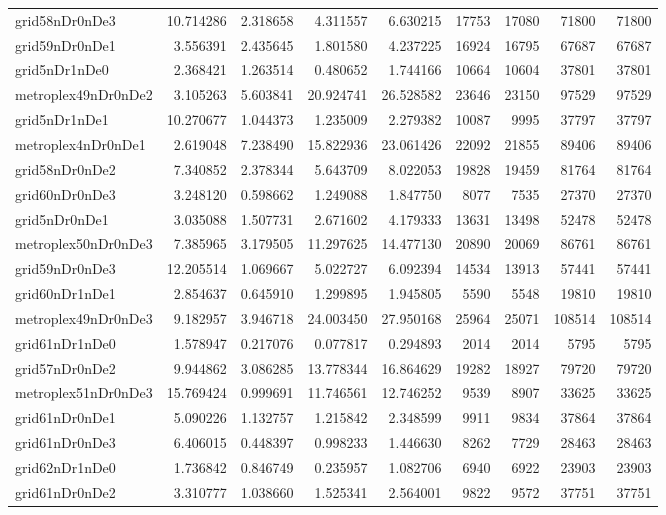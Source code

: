\begin{longtable}{|l|r|r|r|r|r|r|r|r|}
grid58nDr0nDe3 & 10.714286 & 2.318658 & 4.311557 & 6.630215 & 17753 & 17080 & 71800 & 71800 \\
grid59nDr0nDe1 & 3.556391 & 2.435645 & 1.801580 & 4.237225 & 16924 & 16795 & 67687 & 67687 \\
grid5nDr1nDe0 & 2.368421 & 1.263514 & 0.480652 & 1.744166 & 10664 & 10604 & 37801 & 37801 \\
metroplex49nDr0nDe2 & 3.105263 & 5.603841 & 20.924741 & 26.528582 & 23646 & 23150 & 97529 & 97529 \\
grid5nDr1nDe1 & 10.270677 & 1.044373 & 1.235009 & 2.279382 & 10087 & 9995 & 37797 & 37797 \\
metroplex4nDr0nDe1 & 2.619048 & 7.238490 & 15.822936 & 23.061426 & 22092 & 21855 & 89406 & 89406 \\
grid58nDr0nDe2 & 7.340852 & 2.378344 & 5.643709 & 8.022053 & 19828 & 19459 & 81764 & 81764 \\
grid60nDr0nDe3 & 3.248120 & 0.598662 & 1.249088 & 1.847750 & 8077 & 7535 & 27370 & 27370 \\
grid5nDr0nDe1 & 3.035088 & 1.507731 & 2.671602 & 4.179333 & 13631 & 13498 & 52478 & 52478 \\
metroplex50nDr0nDe3 & 7.385965 & 3.179505 & 11.297625 & 14.477130 & 20890 & 20069 & 86761 & 86761 \\
grid59nDr0nDe3 & 12.205514 & 1.069667 & 5.022727 & 6.092394 & 14534 & 13913 & 57441 & 57441 \\
grid60nDr1nDe1 & 2.854637 & 0.645910 & 1.299895 & 1.945805 & 5590 & 5548 & 19810 & 19810 \\
metroplex49nDr0nDe3 & 9.182957 & 3.946718 & 24.003450 & 27.950168 & 25964 & 25071 & 108514 & 108514 \\
grid61nDr1nDe0 & 1.578947 & 0.217076 & 0.077817 & 0.294893 & 2014 & 2014 & 5795 & 5795 \\
grid57nDr0nDe2 & 9.944862 & 3.086285 & 13.778344 & 16.864629 & 19282 & 18927 & 79720 & 79720 \\
metroplex51nDr0nDe3 & 15.769424 & 0.999691 & 11.746561 & 12.746252 & 9539 & 8907 & 33625 & 33625 \\
grid61nDr0nDe1 & 5.090226 & 1.132757 & 1.215842 & 2.348599 & 9911 & 9834 & 37864 & 37864 \\
grid61nDr0nDe3 & 6.406015 & 0.448397 & 0.998233 & 1.446630 & 8262 & 7729 & 28463 & 28463 \\
grid62nDr1nDe0 & 1.736842 & 0.846749 & 0.235957 & 1.082706 & 6940 & 6922 & 23903 & 23903 \\
grid61nDr0nDe2 & 3.310777 & 1.038660 & 1.525341 & 2.564001 & 9822 & 9572 & 37751 & 37751 \\

\end{longtable}
